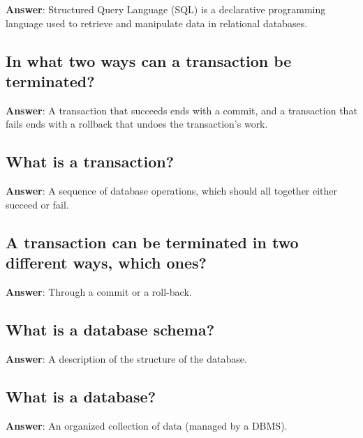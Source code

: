 \documentclass[a4paper,11pt,oneside]{article}
\begin{document}
\begin{sloppypar}
\label{q:284:sa:en:True}

\textbf{Answer}: Structured Query Language (SQL) is a declarative programming language used to retrieve and manipulate data in relational databases.



\subsection{In what two ways can a transaction be terminated?}

\label{q:285:sa:en:True}

\textbf{Answer}: A transaction that succeeds ends with a commit, and a transaction that fails ends with a rollback that undoes the transaction's work.



\subsection{What is a transaction?}

\label{q:286:sa:en:True}

\textbf{Answer}: A sequence of database operations, which should all together either succeed or fail.



\subsection{A transaction can be terminated in two different ways, which ones?}

\label{q:287:sa:en:True}

\textbf{Answer}: Through a commit or a roll-back.



\subsection{What is a database schema?}

\label{q:288:sa:en:True}

\textbf{Answer}: A description of the structure of the database.



\subsection{What is a database?}

\label{q:289:sa:en:True}

\textbf{Answer}: An organized collection of data (managed by a DBMS).




\end{sloppypar}
\end{document}
